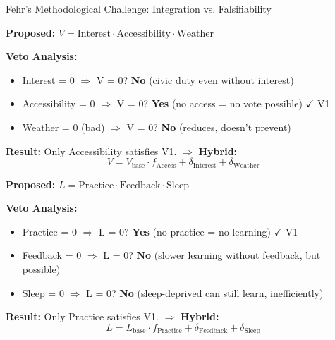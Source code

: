 \begin{chapter}{Fehr's Methodological Challenge: Integration vs. Falsifiability}
\begin{example}
\label{ex:exc-turnout}
\textbf{Proposed:} $V = \text{Interest} \cdot \text{Accessibility} \cdot \text{Weather}$

\textbf{Veto Analysis:}
\begin{itemize}[noitemsep]
    \item Interest = 0 $\Rightarrow$ V = 0? \textbf{No} (civic duty even without interest)
    \item Accessibility = 0 $\Rightarrow$ V = 0? \textbf{Yes} (no access = no vote possible) $\checkmark$ V1
    \item Weather = 0 (bad) $\Rightarrow$ V = 0? \textbf{No} (reduces, doesn't prevent)
\end{itemize}

\textbf{Result:} Only Accessibility satisfies V1. $\Rightarrow$ \textbf{Hybrid:}
\begin{equation}
V = V_{\text{base}} \cdot f_{\text{Access}} + \delta_{\text{Interest}} + \delta_{\text{Weather}}
\end{equation}
\end{example}

\begin{example}
\label{ex:exc-learning}
\textbf{Proposed:} $L = \text{Practice} \cdot \text{Feedback} \cdot \text{Sleep}$

\textbf{Veto Analysis:}
\begin{itemize}[noitemsep]
    \item Practice = 0 $\Rightarrow$ L = 0? \textbf{Yes} (no practice = no learning) $\checkmark$ V1
    \item Feedback = 0 $\Rightarrow$ L = 0? \textbf{No} (slower learning without feedback, but possible)
    \item Sleep = 0 $\Rightarrow$ L = 0? \textbf{No} (sleep-deprived can still learn, inefficiently)
\end{itemize}

\textbf{Result:} Only Practice satisfies V1. $\Rightarrow$ \textbf{Hybrid:}
\begin{equation}
L = L_{\text{base}} \cdot f_{\text{Practice}} + \delta_{\text{Feedback}} + \delta_{\text{Sleep}}
\end{equation}
\end{example}


\end{chapter}
